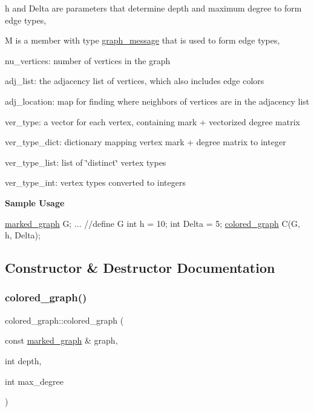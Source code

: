 \begin{DoxyItemize}
\item h and Delta are parameters that determine depth and maximum degree to form edge types,
\item M is a member with type \hyperlink{classgraph__message}{graph\+\_\+message} that is used to form edge types,
\item nu\+\_\+vertices\+: number of vertices in the graph
\item adj\+\_\+list\+: the adjacency list of vertices, which also includes edge colors
\item adj\+\_\+location\+: map for finding where neighbors of vertices are in the adjacency list
\item ver\+\_\+type\+: a vector for each vertex, containing mark + vectorized degree matrix
\item ver\+\_\+type\+\_\+dict\+: dictionary mapping vertex mark + degree matrix to integer
\item ver\+\_\+type\+\_\+list\+: list of \char`\"{}distinct\char`\"{} vertex types
\item ver\+\_\+type\+\_\+int\+: vertex types converted to integers
\end{DoxyItemize}

{\bfseries Sample Usage}


\begin{DoxyCode}
\hyperlink{classmarked__graph}{marked\_graph} G;
... \textcolor{comment}{//define G}
\textcolor{keywordtype}{int} h = 10;
\textcolor{keywordtype}{int} Delta = 5;
\hyperlink{classcolored__graph}{colored\_graph} C(G, h, Delta);
\end{DoxyCode}
 

\subsection{Constructor \& Destructor Documentation}
\mbox{\label{classcolored__graph_a0374481a0474ac8e9b77689f74b5ed9b}} 
\subsubsection{\texorpdfstring{colored\+\_\+graph()}{colored\_graph()}\hspace{0.1cm}{\footnotesize\ttfamily [1/2]}}
{\footnotesize\ttfamily colored\+\_\+graph\+::colored\+\_\+graph (\begin{DoxyParamCaption}\item[{const \hyperlink{classmarked__graph}{marked\+\_\+graph} \&}]{graph,  }\item[{int}]{depth,  }\item[{int}]{max\+\_\+degree }\end{DoxyParamCaption})\hspace{0.3cm}{\ttfamily [inline]}}



